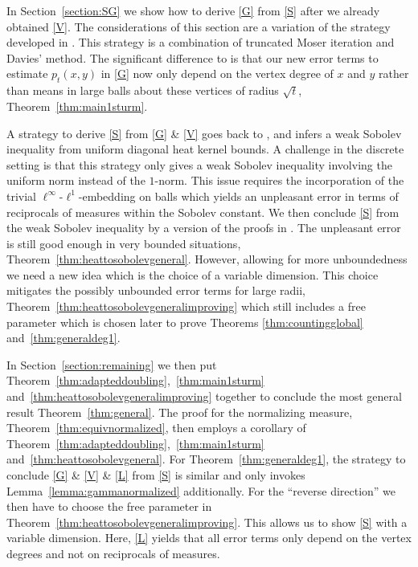 \documentclass[JEP,XML,SOM,Unicode,published]{cedram}
\theoremstyle{plain}
\theoremstyle{definition}
\begin{document}
In Section~\ref{section:SG} we show how to derive \eqref{G} from \eqref{S} after we already obtained \eqref{V}. The considerations of this section are a variation of the strategy developed in \cite{KellerRose-22a}. This strategy is a combination of truncated Moser iteration and Davies' method. The significant difference to \cite{KellerRose-22a} is that our new error terms to estimate $ p_{t}(x,y) $ in \eqref{G} now only depend on the vertex degree of $ x $ and $ y $ rather than means in large balls about these vertices of radius $ \sqrt{t} $, \cf Theorem~\ref{thm:main1sturm}.

A strategy to derive \eqref{S} from \eqref{G} \& \eqref{V} goes back to \cite{Varopoulos-85}, \cf \cite{SaloffC-01} and infers a weak Sobolev inequality from uniform diagonal heat kernel bounds. A challenge in the discrete setting is that this strategy only gives a weak Sobolev inequality involving the uniform norm instead of the $ 1 $-norm.
This issue requires the incorporation of the trivial $\ell^\infty$-$\ell^1$-embedding on balls which yields an unpleasant error in terms of reciprocals of measures within the Sobolev constant. We then conclude \eqref{S} from the weak Sobolev inequality by a version of the proofs in \cite{Barlow-book, Delmotte-97}. The unpleasant error is still good enough in very bounded situations, \cf Theorem~\ref{thm:heattosobolevgeneral}. However, allowing for more unboundedness we need a new idea which is the choice of a variable dimension. This choice mitigates the possibly unbounded error terms for large radii, \cf Theorem~\ref{thm:heattosobolevgeneralimproving} which still includes a free parameter which is chosen later to prove Theorems \ref{thm:countingglobal} and~\ref{thm:generaldeg1}.

In Section~\ref{section:remaining} we then put Theorem~\ref{thm:adapteddoubling},~\ref{thm:main1sturm} and~\ref{thm:heattosobolevgeneralimproving} together to conclude the most general result Theorem~\ref{thm:general}. The proof for the normalizing measure, Theorem~\ref{thm:equivnormalized}, then employs a corollary of Theorem~\ref{thm:adapteddoubling},~\ref{thm:main1sturm} and~\ref{thm:heattosobolevgeneral}. For Theorem~\ref{thm:generaldeg1}, the strategy to conclude \eqref{G} \& \eqref{V} \& \eqref{L}
from \eqref{S} is similar and only invokes Lemma~\ref{lemma:gammanormalized} additionally. For the ``reverse direction'' we then have to choose the free parameter in Theorem~\ref{thm:heattosobolevgeneralimproving}. This allows us to show \eqref{S} with a variable dimension. Here, \eqref{L} yields that all error terms only depend on the vertex degrees and not on reciprocals of measures.
\end{document}
